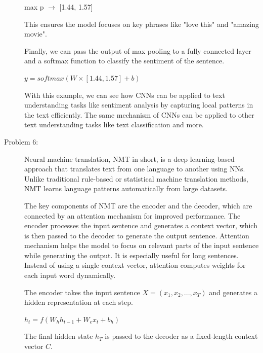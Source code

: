 \documentclass[10pt]{article}
\begin{document}
\begin{description}
\begin{center}
    max p $\rightarrow$ [1.44, 1.57]
\end{center}

This ensures the model focuses on key phrases like "love this" and "amazing movie".

Finally, we can pass the output of max pooling to a fully connected layer and a softmax function to classify the sentiment of the sentence.

\begin{center}
    $y = softmax(W \times [1.44, 1.57] + b)$
\end{center}

With this example, we can see how CNNs can be applied to text understanding tasks like sentiment analysis by capturing local patterns in the text efficiently.
The same mechanism of CNNs can be applied to other text understanding tasks like text classification and more.

\pagebreak

\item[Problem 6:] \hfill %

Neural machine translation, NMT in short, is a deep learning-based approach that translates text from one language to another using NNs.
Unlike traditional rule-based or statistical machine translation methods, NMT learns language patterns automatically from large datasets.

The key components of NMT are the encoder and the decoder, which are connected by an attention mechanism for improved performance.
The encoder processes the input sentence and generates a context vector, which is then passed to the decoder to generate the output sentence.
Attention mechanism helps the model to focus on relevant parts of the input sentence while generating the output. It is especially useful for long sentences.
Instead of using a single context vector, attention computes weights for each input word dynamically.

The encoder takes the input sentence $X = (x_1, x_2, ..., x_T)$ and generates a hidden representation at each step.

\begin{center}
    $h_t = f(W_{h}h_{t-1} + W_{e}x_t + b_h)$
\end{center}

The final hidden state $h_T$ is passed to the decoder as a fixed-length context vector $C$.


\end{description}
\end{document}
